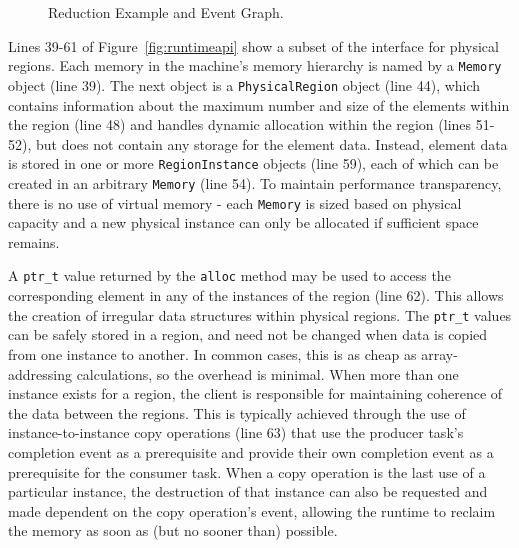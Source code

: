 \begin{figure}
{{
}
}
  \caption{Reduction Example and Event Graph.\label{fig:reducevents}}
  \vspace{-4mm}
\end{figure}

Lines 39-61 of Figure~\ref{fig:runtimeapi} show a subset of the interface for physical regions.  
Each memory in the machine's memory hierarchy is named by a {\tt Memory} object (line 39).
The next object is a {\tt PhysicalRegion} object (line 44), which contains information about the
maximum number and size of the elements within the region (line 48) and handles dynamic allocation
within the region (lines 51-52), but does not contain any storage for the element data.  Instead,
element data is stored in one or more {\tt RegionInstance} objects (line 59), each of which can be
created in an arbitrary {\tt Memory} (line 54).  To maintain performance transparency, there is no
use of virtual memory - each {\tt Memory} is sized based on physical capacity and a new physical
instance can only be allocated if sufficient space remains.

A {\tt ptr\_t} value returned by the {\tt alloc}
method may be used to access the corresponding element in any of the instances of the region (line 62).
This
allows the creation of irregular data structures within physical regions.  The {\tt ptr\_t} values can
be safely stored in a region, and need not be changed when data is copied from one instance to another.
In common cases, this is as cheap as array-addressing calculations, so the overhead is minimal.
When more than one instance exists for a region, the client is responsible for maintaining coherence
of the data between the regions.  This is typically achieved through the use of instance-to-instance
copy operations (line 63) that use the producer task's completion event as a prerequisite and provide
their own completion event as a prerequisite for the consumer task.  When a copy operation is
the last use of a particular instance, the destruction of that instance can also be requested and made
dependent on the copy operation's event, allowing the runtime to reclaim the memory as soon as (but no
sooner than) possible.

